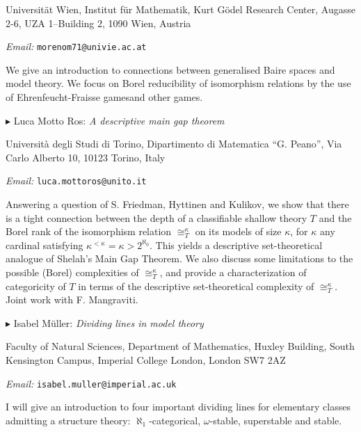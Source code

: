\documentclass[a4paper]{amsart}
\theoremstyle{remark}
\newcommand{\vsp}{\vspace{20pt}}
\begin{document}
\noindent 
Universit\"at Wien, Institut f\"ur Mathematik, 
Kurt G\"odel Research Center, 
Augasse 2-6, UZA 1--Building 2, 
1090 Wien, Austria 

\noindent 
\emph{Email:} \texttt{morenom71@univie.ac.at}

We give an introduction to connections between generalised Baire spaces and model theory. We focus on Borel reducibility of isomorphism relations by the use of Ehrenfeucht-Fraisse gamesand other games. 










\vsp 

\noindent 
$\blacktriangleright$ Luca Motto Ros: \emph{A descriptive main gap theorem} 

\noindent 
Universit\`a degli Studi di Torino, Dipartimento di Matematica ``G. Peano'', Via Carlo Alberto 10, 10123 Torino, Italy

\noindent 
\emph{Email:} \texttt{luca.mottoros@unito.it}

Answering a question of S. Friedman, Hyttinen and Kulikov, we show that there is a tight connection between the depth of a classifiable shallow theory $T$ and the Borel rank of the isomorphism relation $\cong^\kappa_T$ on its models of size $\kappa$, for $\kappa$ any cardinal satisfying $\kappa^{< \kappa} = \kappa > 2^{\aleph_0}$. This yields a descriptive set-theoretical analogue of Shelah’s Main Gap Theorem. We also discuss some limitations to the possible (Borel) complexities of $\cong^\kappa_T$, and provide a characterization of categoricity of $T$ in terms of the descriptive set-theoretical complexity of $\cong^\kappa_T$. Joint work with F. Mangraviti.








\vsp 

\noindent 
$\blacktriangleright$ Isabel M\"uller: \emph{Dividing lines in model theory} 

\noindent 
Faculty of Natural Sciences, Department of Mathematics, 
Huxley Building, 
South Kensington Campus, 
Imperial College London, 
London 
SW7 2AZ

\noindent 
\emph{Email:} \texttt{isabel.muller@imperial.ac.uk}

I will give an introduction to four important dividing lines for elementary classes admitting a structure theory: $\aleph_1$-categorical, $\omega$-stable, superstable and stable. 
\end{document}
